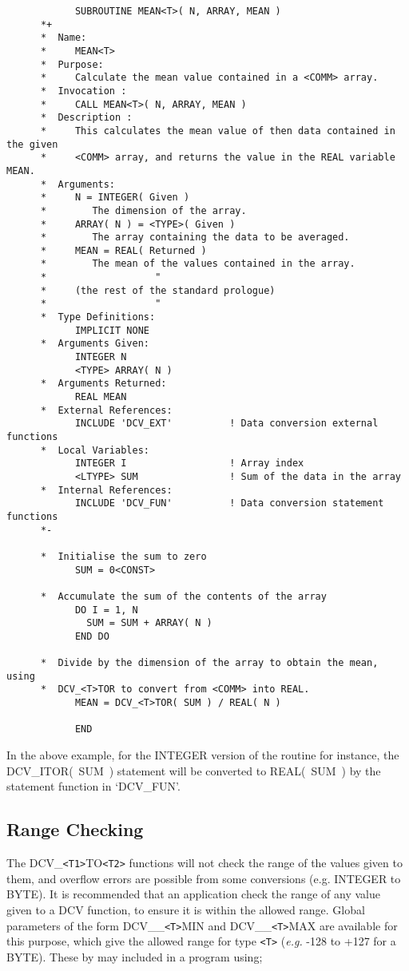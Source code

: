 \begin{verbatim}
            SUBROUTINE MEAN<T>( N, ARRAY, MEAN )
      *+
      *  Name:
      *     MEAN<T>
      *  Purpose:
      *     Calculate the mean value contained in a <COMM> array.
      *  Invocation :
      *     CALL MEAN<T>( N, ARRAY, MEAN )
      *  Description :
      *     This calculates the mean value of then data contained in the given
      *     <COMM> array, and returns the value in the REAL variable MEAN.
      *  Arguments:
      *     N = INTEGER( Given )
      *        The dimension of the array.
      *     ARRAY( N ) = <TYPE>( Given )
      *        The array containing the data to be averaged.
      *     MEAN = REAL( Returned )
      *        The mean of the values contained in the array.
      *                   "
      *     (the rest of the standard prologue)
      *                   "
      *  Type Definitions:
            IMPLICIT NONE
      *  Arguments Given:
            INTEGER N
            <TYPE> ARRAY( N )
      *  Arguments Returned:
            REAL MEAN
      *  External References:
            INCLUDE 'DCV_EXT'          ! Data conversion external functions
      *  Local Variables:
            INTEGER I                  ! Array index
            <LTYPE> SUM                ! Sum of the data in the array
      *  Internal References:
            INCLUDE 'DCV_FUN'          ! Data conversion statement functions
      *-
      
      *  Initialise the sum to zero
            SUM = 0<CONST>
      
      *  Accumulate the sum of the contents of the array
            DO I = 1, N
              SUM = SUM + ARRAY( N )
            END DO
      
      *  Divide by the dimension of the array to obtain the mean, using
      *  DCV_<T>TOR to convert from <COMM> into REAL.
            MEAN = DCV_<T>TOR( SUM ) / REAL( N )

            END
\end{verbatim}

In the above example, for the INTEGER version of the routine for
instance, the DCV\_ITOR(~SUM~) statement will be converted to
REAL(~SUM~) by the statement function in `DCV\_FUN'. 

\subsection{Range Checking}

The DCV\_\verb+<T1>+TO\verb+<T2>+ functions will not check the range of the 
values given to them, and overflow errors are possible from some conversions
(e.g. INTEGER to BYTE).
It is recommended that an application check the range of any value
given to a DCV function, to ensure it is within the allowed range.
Global parameters of the form DCV\_\_\verb+<T>+MIN and DCV\_\_\verb+<T>+MAX 
are available for this purpose, which give the allowed range for type
\verb+<T>+ ({\it e.g.} -128 to +127 for a BYTE).
These by may included in a program using;


